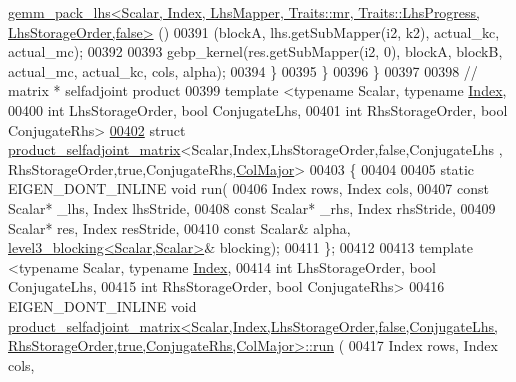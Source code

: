 \begin{DoxyCode}
      \hyperlink{struct_eigen_1_1internal_1_1gemm__pack__lhs}{gemm\_pack\_lhs<Scalar, Index, LhsMapper, Traits::mr, Traits::LhsProgress, LhsStorageOrder,false>}
      ()
00391           (blockA, lhs.getSubMapper(i2, k2), actual\_kc, actual\_mc);
00392 
00393         gebp\_kernel(res.getSubMapper(i2, 0), blockA, blockB, actual\_mc, actual\_kc, cols, alpha);
00394       \}
00395     \}
00396   \}
00397 
00398 \textcolor{comment}{// matrix * selfadjoint product}
00399 \textcolor{keyword}{template} <\textcolor{keyword}{typename} Scalar, \textcolor{keyword}{typename} \hyperlink{namespace_eigen_a62e77e0933482dafde8fe197d9a2cfde}{Index},
00400           \textcolor{keywordtype}{int} LhsStorageOrder, \textcolor{keywordtype}{bool} ConjugateLhs,
00401           \textcolor{keywordtype}{int} RhsStorageOrder, \textcolor{keywordtype}{bool} ConjugateRhs>
\hyperlink{struct_eigen_1_1internal_1_1product__selfadjoint__matrix_3_01_scalar_00_01_index_00_01_lhs_storadd08b9e76d992b3a954c3041feed2ed9}{00402} \textcolor{keyword}{struct }\hyperlink{struct_eigen_1_1internal_1_1product__selfadjoint__matrix}{product\_selfadjoint\_matrix}<Scalar,Index,LhsStorageOrder,false,ConjugateLhs
      , RhsStorageOrder,true,ConjugateRhs,\hyperlink{group__enums_ggaacded1a18ae58b0f554751f6cdf9eb13a0cbd4bdd0abcfc0224c5fcb5e4f6669a}{ColMajor}>
00403 \{
00404 
00405   \textcolor{keyword}{static} EIGEN\_DONT\_INLINE \textcolor{keywordtype}{void} run(
00406     Index rows, Index cols,
00407     \textcolor{keyword}{const} Scalar* \_lhs, Index lhsStride,
00408     \textcolor{keyword}{const} Scalar* \_rhs, Index rhsStride,
00409     Scalar* res,        Index resStride,
00410     \textcolor{keyword}{const} Scalar& alpha, \hyperlink{class_eigen_1_1internal_1_1level3__blocking}{level3\_blocking<Scalar,Scalar>}& blocking);
00411 \};
00412 
00413 \textcolor{keyword}{template} <\textcolor{keyword}{typename} Scalar, \textcolor{keyword}{typename} \hyperlink{namespace_eigen_a62e77e0933482dafde8fe197d9a2cfde}{Index},
00414           \textcolor{keywordtype}{int} LhsStorageOrder, \textcolor{keywordtype}{bool} ConjugateLhs,
00415           \textcolor{keywordtype}{int} RhsStorageOrder, \textcolor{keywordtype}{bool} ConjugateRhs>
00416 EIGEN\_DONT\_INLINE \textcolor{keywordtype}{void} 
      \hyperlink{struct_eigen_1_1internal_1_1product__selfadjoint__matrix}{product\_selfadjoint\_matrix<Scalar,Index,LhsStorageOrder,false,ConjugateLhs,
       RhsStorageOrder,true,ConjugateRhs,ColMajor>::run}
      (
00417     Index rows, Index cols,

\end{DoxyCode}
